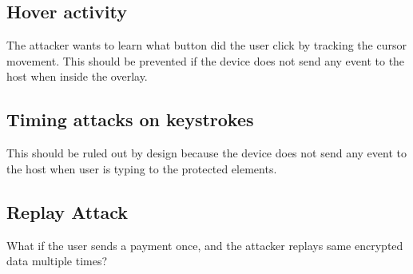 \subsection{Hover activity}
The attacker wants to learn what button did the user click by tracking the cursor movement. This should be prevented if the device does not send any event to the host when inside the overlay.

\subsection{Timing attacks on keystrokes}
This should be ruled out by design because the device does not send any event to the host when user is typing to the protected elements.

\subsection{Replay Attack}
What if the user sends a payment once, and the attacker replays same encrypted data multiple times?



\iffalse
\subsection{Protection against phishing attacks}
\subsection{Keyboard Manipulation Attacks and Defenses}
\subsubsection{Change user selected values}


\subsection{Mouse Manipulation Attacks and Defenses}
\subsubsection{Changing mouse position}
Changing the mouse position can be detected by the device as the device expects to find it in the location that the user provides. 
\subsubsection{Removing the mouse completely}
This is detectable by the \device as the \device no longer finds the mouse pointer in the screen at the designated position.  
\subsubsection{Add mouse cursor to confuse users}

\subsection{UI Manipulation Attacks and Defenses}
\subsubsection{Manipulate the position of the UI elements on the screen}
\fi